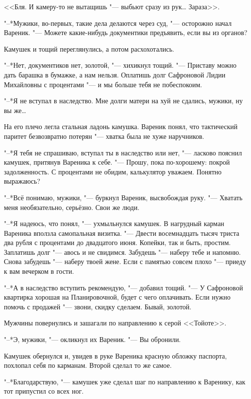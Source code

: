 <<Бля.
И камеру-то не вытащишь "--- выбьют сразу из рук\ldots{}
Зараза>>.

"--*Мужики, во-первых, такие дела делаются через суд, "--- осторожно начал Вареник.
"--- Можете какие-нибудь документики предъявить, если вы из органов?

Камушек и тощий переглянулись, а потом расхохотались.

"--*Нет, документиков нет, золотой, "--- хихикнул тощий.
"--- Приставу можно дать барашка в бумажке, а нам нельзя.
Оплатишь долг Сафроновой Лидии Михайловны с процентами "--- и мы больше тебя не побеспокоим.

"--*Я не вступал в наследство.
Мне долги матери на хуй не сдались, мужики, ну вы же\ldots{}

На его плечо легла стальная ладонь камушка.
Вареник понял, что тактический паритет безвозвратно потерян "--- хватка была не хуже наручников.

"--*Я тебя не спрашиваю, вступал ты в наследство или нет, "--- ласково пояснил камушек, притянув Вареника к себе.
"--- Прошу, пока по-хорошему: покрой задолженность.
С процентами не обидим, калькулятор уважаем.
Понятно выражаюсь?

"--*Всё понимаю, мужики, "--- буркнул Вареник, высвобождая руку.
"--- Хватать меня необязательно, серьёзно.
Свои же люди.

"--*Я надеюсь, что понял, "--- ухмыльнулся камушек.
В нагрудный карман Вареника вползла самопальная визитка.
"--- Двести восемнадцать тысяч триста два рубля с процентами до двадцатого июня.
Копейки, так и быть, простим.
Заплатишь долг "--- авось и не свидимся.
Забудешь "--- наберу тебе и напомню.
Снова забудешь "--- наберу твоей жене.
Если с памятью совсем плохо "--- приеду к вам вечерком в гости.

"--*А в наследство вступить рекомендую, "--- добавил тощий.
"--- У Сафроновой квартирка хорошая на Планировочной, будет с чего оплачивать.
Если нужно помочь с продажей "--- звони, скидку сделаем.
Бывай, золотой.

Мужчины повернулись и зашагали по направлению к серой <<Тойоте>>.

"--*Э, мужики, "--- окликнул их Вареник.
"--- Вы обронили.

Камушек обернулся и, увидев в руке Вареника красную обложку паспорта, похлопал себя по карманам.
Второй сделал то же самое.

"--*Благодарствую, "--- камушек уже сделал шаг по направлению к Варенику, как тот припустил со всех ног.

